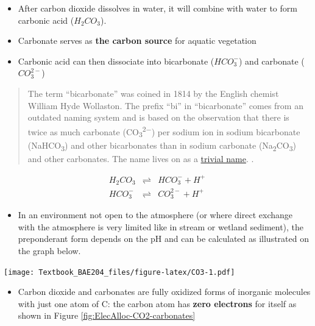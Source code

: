 \documentclass[]{book}
\providecommand{\tightlist}{%
  \setlength{\itemsep}{0pt}\setlength{\parskip}{0pt}}
\theoremstyle{definition}
\theoremstyle{definition}
\theoremstyle{definition}
\theoremstyle{remark}
\begin{document}
\begin{itemize}
\tightlist
\item
  After carbon dioxide dissolves in water, it will combine with water to
  form carbonic acid (\(H_2CO_3\)).
\item
  Carbonate serves as \textbf{the carbon source} for aquatic vegetation
\item
  Carbonic acid can then dissociate into bicarbonate (\(HCO_3^-\)) and
  carbonate (\(CO_3^{2-}\))
\end{itemize}

\begin{quote}
The term ``bicarbonate'' was coined in 1814 by the English chemist
William Hyde Wollaston. The prefix ``bi'' in ``bicarbonate'' comes from
an outdated naming system and is based on the observation that there is
twice as much carbonate (CO\textsubscript{3}\textsuperscript{2−}) per
sodium ion in sodium bicarbonate (NaHCO\textsubscript{3}) and other
bicarbonates than in sodium carbonate
(Na\textsubscript{2}CO\textsubscript{3}) and other carbonates. The name
lives on as a \href{https://en.wikipedia.org/wiki/Trivial_name}{trivial
name}. \citep{Wikipedia_contributors2018-lc}.
\end{quote}

\begin{align}
H_2CO_3  & \rightleftharpoons & HCO_3^- + H^+  \label{eq:H2CO3} \\
HCO_3^- & \rightleftharpoons & CO_3^{2-} + H^+ \label{eq:HCO3}
\end{align}

\begin{itemize}
\tightlist
\item
  In an environment not open to the atmosphere (or where direct exchange
  with the atmosphere is very limited like in stream or wetland
  sediment), the preponderant form depends on the pH and can be
  calculated as illustrated on the graph below.
\end{itemize}

\texttt{[image: Textbook\_BAE204\_files/figure-latex/CO3-1.pdf]}

\begin{itemize}
\tightlist
\item
  Carbon dioxide and carbonates are fully oxidized forms of inorganic
  molecules with just one atom of C: the carbon atom has \textbf{zero
  electrons} for itself as shown in Figure
  \ref{fig:ElecAlloc-CO2-carbonates}
\end{itemize}
\end{document}
